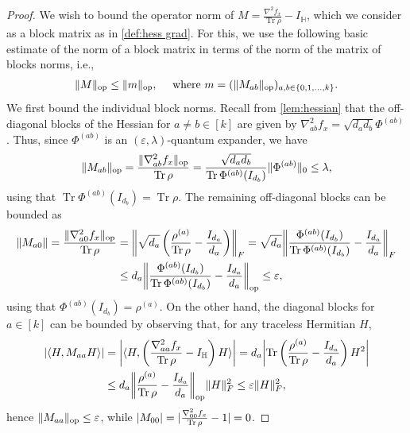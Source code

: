 \documentclass[aos]{imsart}
\theoremstyle{definition}
\numberwithin{equation}{section}
\DeclareMathOperator{\op}{op}
\DeclareMathOperator{\tr}{Tr}
\DeclarePairedDelimiter{\abs}{\lvert}{\rvert}
\DeclarePairedDelimiter{\norm}{\lVert}{\rVert}
\renewcommand{\H}{{\mathbb{H}}}
\newcommand{\eps}{\varepsilon}
\newcommand{\samp}{x}
\begin{document}
\begin{proof}
We wish to bound the operator norm of $M = \frac{\nabla^2 f_\samp}{\tr \rho} - I_\H$, which we consider as a block matrix as in \cref{def:hess grad}.
For this, we use the following basic estimate of the norm of a block matrix in terms of the norm of the matrix of blocks norms, i.e.,
\begin{align}\label{eq:baby norm bounds}
  \norm{M}_{\op} \leq \norm{m}_{\op},
\quad \text{ where } m=(\norm{M_{ab}}_{\op})_{a,b\in\{0,1,\dots,k\}}.
\end{align}
We first bound the individual block norms.
Recall from \cref{lem:hessian} that the off-diagonal blocks of the Hessian for $a \neq b\in[k]$ are given by $\nabla^2_{ab} f_x = \sqrt{d_a d_b} \Phi^{(ab)}$.
Thus, since $\Phi^{(ab)}$ is an $(\eps,\lambda)$-quantum expander, we have
\begin{align*}
  \norm{M_{ab}}_{\op}
= \frac{\norm{\nabla^2_{ab} f_x}_{\op}}{\tr\rho}
= \frac{\sqrt{d_a d_b}}{\tr \Phi^{(ab)}(I_{d_b})} \norm{\Phi^{(ab)}}_0
\leq \lambda,
\end{align*}
using that $\tr \Phi^{(ab)}(I_{d_b}) = \tr \rho$.
The remaining off-diagonal blocks can be bounded as
\begin{align*}
\norm{M_{a0}}
= \frac{\norm{\nabla^2_{a0} f_x}_{\op}}{\tr \rho}
&= \norm*{\sqrt{d_a} \left( \frac{\rho^{(a)}}{\tr \rho} - \frac{I_{d_a}}{d_a} \right)}_F
= \sqrt{d_a} \norm*{\frac{\Phi^{(ab)}(I_{d_b})}{\tr \Phi^{(ab)}(I_{d_b})} - \frac{I_{d_a}}{d_a}}_F \\
&\leq d_a \norm*{\frac{\Phi^{(ab)}(I_{d_b})}{\tr \Phi^{(ab)}(I_{d_b})} - \frac{I_{d_a}}{d_a}}_{\op}
\leq \eps,
\end{align*}
using that $\Phi^{(ab)}(I_{d_b}) = \rho^{(a)}$.
On the other hand, the diagonal blocks for $a\in[k]$ can be bounded by observing that, for any traceless Hermitian $H$,
\begin{align*}
  \abs{\braket{H, M_{aa} H}}
&= \abs*{\braket{H, \left( \frac{\nabla^2_{aa} f_x}{\tr \rho} - I_\H \right) H}}
= d_a \abs*{\tr \left( \frac{\rho^{(a)}}{\tr \rho} - \frac{I_{d_a}}{d_a} \right) H^2} \\
&\leq d_a \norm*{\frac{\rho^{(a)}}{\tr \rho} - \frac{I_{d_a}}{d_a}}_{\op} \norm{H}_F^2
\leq \eps \norm H_F^2,
\end{align*}
hence $\norm{M_{aa}}_{\op} \leq \eps$, while $\abs{M_{00}} = \abs{\frac{\nabla^2_{00} f_x}{\tr \rho} - 1} = 0$.

\end{proof}
\end{document}
